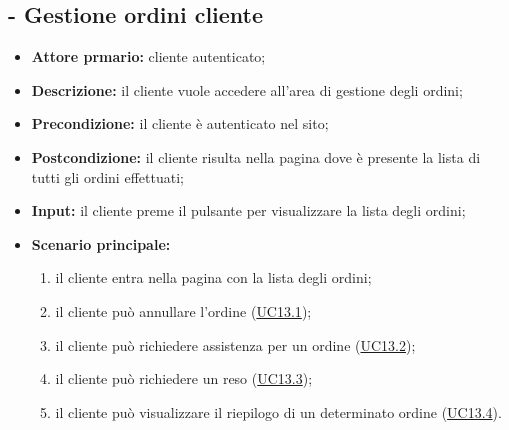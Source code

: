 \subsection{ - Gestione ordini cliente}
\begin{itemize}
    \item \textbf{Attore prmario:} cliente autenticato;
    \item \textbf{Descrizione:} il cliente vuole accedere all'area di gestione degli ordini;
    \item \textbf{Precondizione:} il cliente è autenticato nel sito;
    \item \textbf{Postcondizione:} il cliente risulta nella pagina dove è presente la lista di tutti gli ordini effettuati;
    \item \textbf{Input:} il cliente preme il pulsante per visualizzare la lista degli ordini;
    \item \textbf{Scenario principale:}
          \begin{enumerate}
              \item il cliente entra nella pagina con la lista degli ordini;
              \item il cliente può annullare l'ordine (\hyperref[UC13.1]{UC13.1});
              \item il cliente può richiedere assistenza per un ordine (\hyperref[UC13.2]{UC13.2});
              \item il cliente può richiedere un reso (\hyperref[UC13.3]{UC13.3});
              \item il cliente può visualizzare il riepilogo di un determinato ordine (\hyperref[UC13.4]{UC13.4}).
          \end{enumerate}
\end{itemize}

\stepsubUserCase
